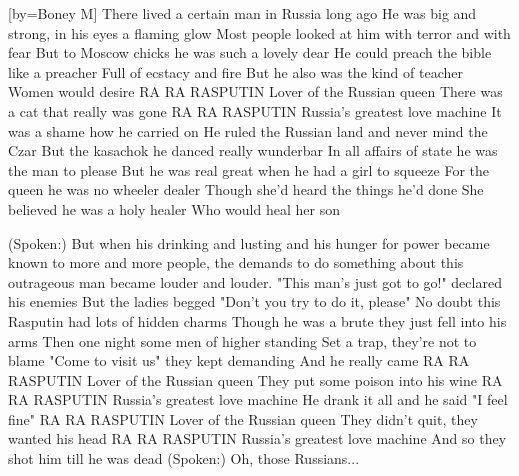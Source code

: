 [by={Boney M}]
\beginverse\singlespacing
There lived a certain man in Russia long ago
He was big and strong, in his eyes a flaming glow
Most people looked at him with terror and with fear
But to Moscow chicks he was such a lovely dear
He could preach the bible like a preacher
Full of ecstacy and fire
But he also was the kind of teacher
Women would desire
\endverse
\beginverse*\singlespacing
{}
  RA RA RASPUTIN
  Lover of the Russian queen
  There was a cat that really was gone
  RA RA RASPUTIN
  Russia's greatest love machine
  It was a shame how he carried on
\endverse
\beginverse\singlespacing
He ruled the Russian land and never mind the Czar
But the kasachok he danced really wunderbar
In all affairs of state he was the man to please
But he was real great when he had a girl to squeeze
For the queen he was no wheeler dealer
Though she'd heard the things he'd done
She believed he was a holy healer
Who would heal her son
\endverse

\beginverse\singlespacing
(Spoken:)
But when his drinking and lusting and his hunger
for power became known to more and more people,
the demands to do something about this outrageous
man became louder and louder.
\endverse
\beginverse\singlespacing
"This man's just got to go!" declared his enemies
But the ladies begged "Don't you try to do it, please"
No doubt this Rasputin had lots of hidden charms
Though he was a brute they just fell into his arms
Then one night some men of higher standing
Set a trap, they're not to blame
"Come to visit us" they kept demanding
And he really came
\endverse
\beginverse\singlespacing
RA RA RASPUTIN
Lover of the Russian queen
They put some poison into his wine
RA RA RASPUTIN
Russia's greatest love machine
He drank it all and he said "I feel fine"
\endverse
\beginverse\singlespacing
RA RA RASPUTIN
Lover of the Russian queen
They didn't quit, they wanted his head
RA RA RASPUTIN
Russia's greatest love machine
And so they shot him till he was dead
\endverse
\beginverse*\singlespacing
(Spoken:) Oh, those Russians... 
\endverse
\endsong
